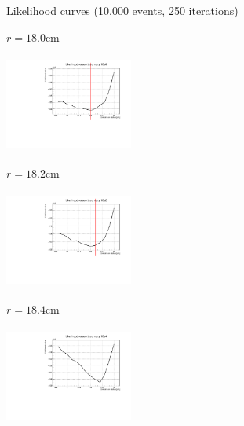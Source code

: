\documentclass[8 pt]{beamer}
\begin{document}
\begin{frame}{Likelihood curves (10.000 events, 250 iterations)}
\justifying
\begin{minipage}[c]{.32\textwidth}
\begin{exampleblock}{} \begin{center}$r = 18.0$cm\end{center} \end{exampleblock}
\includegraphics[width=4.2cm, height=3.2cm]{figs/likelihood250LowStat/likelihood18p0.pdf} 
\end{minipage}
\begin{minipage}[c]{.32\textwidth}
\begin{exampleblock}{} \begin{center}$r = 18.2$cm\end{center} \end{exampleblock}
\includegraphics[width=4.2cm, height=3.2cm]{figs/likelihood250LowStat/likelihood18p2.pdf} 
\end{minipage}
\begin{minipage}[c]{.32\textwidth}
\begin{exampleblock}{} \begin{center}$r = 18.4$cm\end{center} \end{exampleblock}
\includegraphics[width=4.2cm, height=3.2cm]{figs/likelihood250LowStat/likelihood18p4.pdf} 
\end{minipage}


\end{frame}
\end{document}
